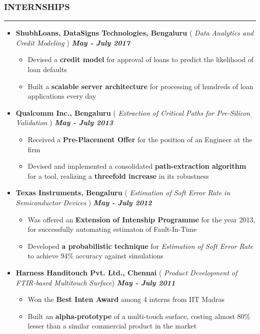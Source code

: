 \documentclass[10pt,a4paper,English]{article}
\newcommand\roottitle[1]{\vspace{-4mm}\subsubsection*{\uppercase{#1}}\vspace{-0.3em}\nopagebreak[4]\hrule}
\newcommand\itemyear[1]{\hfill \textbf{\emph{\color{itemyear} #1}}}
\newcommand\itemenv{\setlength\itemsep{0.5pt} \addtolength{\itemindent}{-5mm}\vspace{-1.5mm}}
\begin{document}
\roottitle{INTERNSHIPS}
\vspace{4mm}
\begin{itemize} \itemenv
    \item \textbf{ ShubhLoans, DataSigns Technologies, Bengaluru } \hfill({\emph{ Data Analytics and Credit Modeling }}) \itemyear{May - July 2017}
        \begin{itemize} \itemenv
            \item Devised a \textbf{credit model} for approval of loans to predict the likelihood of loan defaults
            \item Built a \textbf{scalable server architecture} for processing of hundreds of loan applications every day
        \end{itemize}
    \item \textbf{ Qualcomm Inc., Bengaluru } \hfill({\emph{ Extraction of Critical Paths for Pre-Silicon Validation }}) \itemyear{May - July 2013}
        \begin{itemize} \itemenv
            \item Received a \textbf{Pre-Placement Offer} for the position of an Engineer at the firm
            \item Devised and implemented a consolidated \textbf{path-extraction algorithm} for a tool, realizing a \textbf{threefold increase} in its robustness
        \end{itemize}
    \item \textbf{ Texas Instruments, Bengaluru } \hfill({\emph{ Estimation of Soft Error Rate in Semiconductor Devices }}) \itemyear{May - July 2012}
        \begin{itemize} \itemenv
            \item Was offered an \textbf{Extension of Intenship Programme} for the year 2013, for successfully automating estimaton of Fault-In-Time
            \item Developed \textbf{a probabilistic technique} for \emph{Estimation of Soft Error Rate} to achieve 94\% accuracy against simulations
        \end{itemize}
    \item \textbf{ Harness Handitouch Pvt. Ltd., Chennai } \hfill({\emph{ Product Development of FTIR-based Multitouch Surface}}) \itemyear{May - July 2011}
        \begin{itemize} \itemenv
            \item Won the \textbf{Best Inten Award} among 4 interns from IIT Madras
            \item Built an \textbf{alpha-prototype} of a multi-touch surface, costing almost 80\% lesser than a similar commercial product in the market
        \end{itemize}
  \end{itemize}
\end{document}

